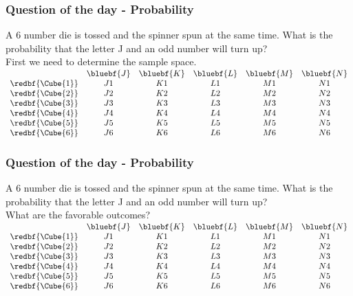   	      	           \begin{frame}
   	      	        	\frametitle{Question of the day - Probability}
   	      	        	A 6 number die is tossed and the spinner spun at the same time. What is the probability that the letter J and an odd number will turn up?
   	      	        	\\
   	      	        	\bigskip
   	      	        	\pause
   	      	        	First we need to determine the sample space.
   	      	        	\\
   	      	        	\bigskip
   	      	        	\pause
   	      	        	$	\begin{array}{ccccccc}
   	      	        	& \bluebf{J} & \bluebf{K}  & \bluebf{L}  &  \bluebf{M} &  \bluebf{N} \\ 
   	      	        	\redbf{\Cube{1}}     	& J1 & K1 & L1 & M1 & N1  \\ 
   	      	        	\redbf{\Cube{2}}       	& J2 & K2 & L2 & M2 & N2  \\ 
   	      	        	\redbf{\Cube{3}}       	& J3 & K3 & L3 & M3 & N3  \\ 
   	      	        	\redbf{\Cube{4}}      	& J4 & K4 & L4 & M4 & N4  \\ 
   	      	        	\redbf{\Cube{5}}     	& J5 & K5 & L5 & M5 & N5  \\ 
   	      	        	\redbf{\Cube{6}}   		& J6 & K6 & L6 & M6 & N6 
   	      	        	\end{array} $
   	      	        	
   	      	        \end{frame}
   	      	        
   	      	        	\begin{frame}
   	      	        		\frametitle{Question of the day - Probability}
   	      	        		A 6 number die is tossed and the spinner spun at the same time. What is the probability that the letter J and an odd number will turn up?
   	      	        		\\
   	      	        		\bigskip
   	      	        		What are the favorable outcomes?
   	      	        		\\
   	      	        		\bigskip
   	      	        		$	\begin{array}{ccccccc}
   	      	        		& \bluebf{J} & \bluebf{K}  & \bluebf{L}  &  \bluebf{M} &  \bluebf{N} \\ 
   	      	        		\redbf{\Cube{1}}     	& J1 & K1 & L1 & M1 & N1  \\ 
   	      	        		\redbf{\Cube{2}}       	& J2 & K2 & L2 & M2 & N2  \\ 
   	      	        		\redbf{\Cube{3}}       	& J3 & K3 & L3 & M3 & N3  \\ 
   	      	        		\redbf{\Cube{4}}      	& J4 & K4 & L4 & M4 & N4  \\ 
   	      	        		\redbf{\Cube{5}}     	& J5 & K5 & L5 & M5 & N5  \\ 
   	      	        		\redbf{\Cube{6}}   		& J6 & K6 & L6 & M6 & N6 
   	      	        		\end{array} $
   	      	        		
   	      	        	\end{frame}
   	      	        	

